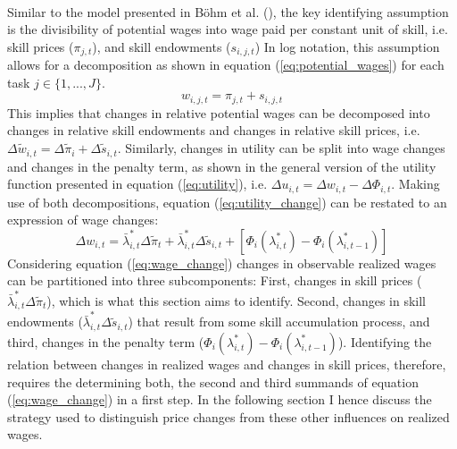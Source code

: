 \documentclass[../main.tex]{subfiles}
\begin{document}
\\ 
Similar to the model presented in Böhm et al. (\citeyear{bohm2019occupation}), the key identifying assumption is the divisibility of potential wages into wage paid per constant unit of skill, i.e. skill prices ($\pi_{j,t}$), and skill endowments ($s_{i,j,t}$) In log notation, this assumption allows for a decomposition as shown in equation (\ref{eq:potential_wages}) for each task $j \in \{1, ...,J\}$.
\begin{equation} \label{eq:potential_wages}
	w_{i,j,t} = \pi_{j,t} + s_{i,j,t} 
\end{equation}
This implies that changes in relative potential wages can be decomposed into changes in relative skill endowments and changes in relative skill prices, i.e. $\Delta \tilde{w}_{i,t} = \Delta \tilde{\pi}_i + \Delta \tilde{s}_{i,t}$. Similarly, changes in utility can be split into wage changes and changes in the penalty term, as shown in the general version of the utility function presented in equation (\ref{eq:utility}), i.e. $\Delta u_{i,t} = \Delta w_{i,t} - \Delta \Phi_{i,t}$. Making use of both decompositions, equation (\ref{eq:utility_change}) can be restated to an expression of wage changes:
\begin{equation} \label{eq:wage_change}
 	\Delta w_{i,t} = \bar{\lambda}^*_{i,t} \Delta \tilde{\pi}_{t} + \bar{\lambda}^*_{i,t} \Delta \tilde{s}_{i,t} + \left[ \Phi_{i}(\lambda_{i,t}^*) - \Phi_{i}(\lambda_{i,t-1}^*) \right]
\end{equation} 
Considering equation (\ref{eq:wage_change}) changes in observable realized wages can be partitioned into three subcomponents: First, changes in skill prices ($\bar{\lambda}^*_{i,t} \Delta \tilde{\pi}_{t}$), which is what this section aims to identify. Second, changes in skill endowments ($\bar{\lambda}^*_{i,t} \Delta \tilde{s}_{i,t}$) that result from some skill accumulation process, and third, changes in the penalty term ($\Phi_{i}(\lambda_{i,t}^*) - \Phi_{i}(\lambda_{i,t-1}^*)$). Identifying the relation between changes in realized wages and changes in skill prices, therefore, requires the determining both, the second and third summands of equation (\ref{eq:wage_change}) in a first step. In the following section I hence discuss the strategy used to distinguish price changes from these other influences on realized wages.
\end{document}
